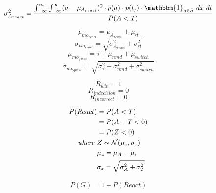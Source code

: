 \documentclass[12pt,letterpaper]{article}
\begin{document}
\begin{equation}
    \sigma^2_{A_{react}} = \dfrac{\int_{-\infty}^{\infty}  \int_{-\infty}^{\infty} (a - \mu_{A_{react}})^2 \cdot p(a) \cdot p(t_{j}) \cdot \mathbbm{1}_{a \in S} \ dx \ dt}{P(A<T)}
\end{equation}



\begin{equation}
    \mu_{mo_{react}} = \mu_{A_{react}} + \mu_{rt}
\end{equation}
\begin{equation}
    \sigma_{mo_{react}} = \sqrt{\sigma_{A_{react}}^2 + \sigma_{rt}^2}
\end{equation}
\begin{equation}
    \mu_{mo_{guess}} = \tau +  \mu_{nmd} + \mu_{switch}
\end{equation}
\begin{equation}
    \sigma_{mo_{guess}} = \sqrt{\sigma_{\tau}^2 + \sigma_{nmd}^2 + \sigma_{switch}^2}
\end{equation}

\begin{equation}
    R_{win} = 1
\end{equation}
\begin{equation}
    R_{indecision} = 0
\end{equation}
\begin{equation}
    R_{incorrect} = 0
\end{equation}

\begin{align}
    P(React)             & = P(A<T) \nonumber                                      \\
                         & = P(A-T<0) \nonumber                                    \\
                         & = P(Z<0)                                                \\
    \text{\emph{where} } & Z\sim \mathcal{N}(\mu_{z}, \sigma_{z})   \nonumber      \\
                         & \mu_z = \mu_A - \mu_\tau                 \nonumber      \\
                         & \sigma_z = \sqrt{\sigma_{A}^2 + \sigma_{T}^2} \nonumber
\end{align}

\begin{align}
    P(G) = 1 - P(React)
\end{align}
\end{document}
